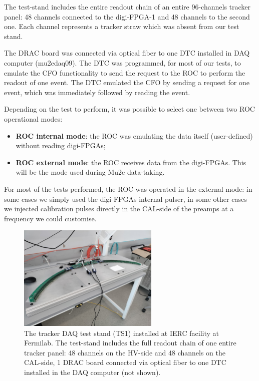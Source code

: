   The test-stand includes the entire readout 
  chain of an entire 96-channels tracker panel:  
  48 channels connected to the digi-FPGA-1 and 
  48 channels to the second one. 
  Each channel represents a tracker straw 
  which was absent from our test stand.

  The DRAC board was connected via optical 
  fiber to one DTC installed in DAQ computer (mu2edaq09).
  The DTC was programmed, for most of our 
  tests, to emulate the CFO 
  functionality to send the request to the 
  ROC to perform the readout of one event.
  The DTC emulated the CFO by sending a request 
  for one event, which was immediately 
  followed by reading the event.


    Depending on the test to perform, it was possible to 
    select one between two ROC operational modes:
    \begin{itemize}
    \item  \textbf{ROC internal mode}: the ROC was emulating the data 
    itself (user-defined) without reading digi-FPGAs;
    \item  \textbf{ROC external mode}: the ROC receives data 
    from the digi-FPGAs. This will be the mode used during 
    Mu2e data-taking.
    \end{itemize}
    For most of the tests performed, the ROC was operated 
    in the external mode: in some cases we simply used the 
    digi-FPGAs internal pulser, in some other cases we injected 
    calibration pulses directly in the CAL-side of the preamps at 
    a frequency we could customise.
    \begin{figure}[!h]
        \centering
        \includegraphics[width =0.6\textwidth]{figures/jpg/IMG_20240219_090538.jpg}
        \caption[The tracker DAQ test stand.]{The tracker DAQ test stand (TS1) installed at IERC facility 
        at Fermilab. The test-stand includes the full readout chain 
        of one entire tracker panel: 48 channels on the HV-side 
        and 48 channels on the CAL-side, 1 DRAC board connected 
        via optical fiber to one DTC installed in the DAQ computer 
        (not shown).}
        \label{fig:TS1}
        \end{figure}

